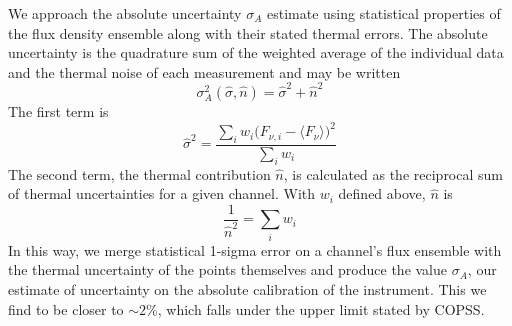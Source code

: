 \documentclass{article}
\begin{document}
	We approach the absolute uncertainty $\sigma_{A}$ estimate using statistical properties of the flux density ensemble along with their stated thermal errors.  The absolute uncertainty is the quadrature  sum of the weighted average of the individual data and the thermal noise of each measurement and may be written
	$$\sigma_{A}^{2}(\hat{\sigma}, \hat{n}) = \hat{\sigma}^{2} + \hat{n}^{2}$$
The first term is 
		$$\hat{\sigma}^{2} = \frac{\sum_{i} w_{i} \big( F_{\nu,i} - \langle F_{\nu} \rangle \big)^{2} }{\sum_{i} w_{i}}$$
	The second term, the thermal contribution $\hat{n}$, is calculated as the reciprocal sum of thermal uncertainties for a given channel.
	With $w_{i}$ defined above, $\hat{n}$ is
	$$ \frac{1}{\hat{n}^{2}} = \sum_{i} w_{i} $$
	In this way, we merge statistical 1-sigma error on a channel's flux ensemble with the thermal uncertainty of the points themselves and produce the value $\sigma_{A}$, our estimate of uncertainty on the absolute calibration of the instrument.
	This we find to be closer to $\sim2\%$, which falls under the upper limit stated by COPSS.
\end{document}
